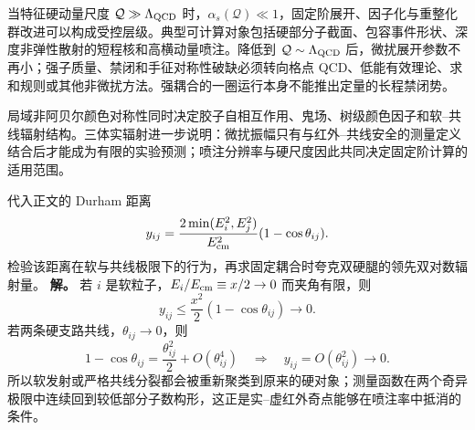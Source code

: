 当特征硬动量尺度 $\mathcal Q\gg\Lambda_{\rm QCD}$ 时，$\alpha_s(\mathcal Q)\ll1$，固定阶展开、因子化与重整化群改进可以构成受控层级。典型可计算对象包括硬部分子截面、包容事件形状、深度非弹性散射的短程核和高横动量喷注。降低到 $\mathcal Q\sim\Lambda_{\rm QCD}$ 后，微扰展开参数不再小；强子质量、禁闭和手征对称性破缺必须转向格点 QCD、低能有效理论、求和规则或其他非微扰方法。强耦合的一圈运行本身不能推出定量的长程禁闭势。


局域非阿贝尔颜色对称性同时决定胶子自相互作用、鬼场、树级颜色因子和软--共线辐射结构。三体实辐射进一步说明：微扰振幅只有与红外--共线安全的测量定义结合后才能成为有限的实验预测；喷注分辨率与硬尺度因此共同决定固定阶计算的适用范围。


\begin{exbox}
代入正文的 Durham 距离
\begin{equation*}
y_{ij}=\frac{2\min(E_i^2,E_j^2)}{E_{\rm cm}^2}(1-\cos\theta_{ij}).
\end{equation*}
检验该距离在软与共线极限下的行为，再求固定耦合时夸克双硬腿的领先双对数辐射量。
\textbf{解。} 若 $i$ 是软粒子，$E_i/E_{\rm cm}\equiv x/2\to0$ 而夹角有限，则
\begin{equation*}
y_{ij}\le \frac{x^2}{2}(1-\cos\theta_{ij})\longrightarrow0.
\end{equation*}
若两条硬支路共线，$\theta_{ij}\to0$，则
\begin{equation*}
1-\cos\theta_{ij}=\frac{\theta_{ij}^2}{2}+O(\theta_{ij}^4)
\quad\Longrightarrow\quad y_{ij}=O(\theta_{ij}^2)\to0.
\end{equation*}
所以软发射或严格共线分裂都会被重新聚类到原来的硬对象；测量函数在两个奇异极限中连续回到较低部分子数构形，这正是实--虚红外奇点能够在喷注率中抵消的条件。


\end{exbox}
